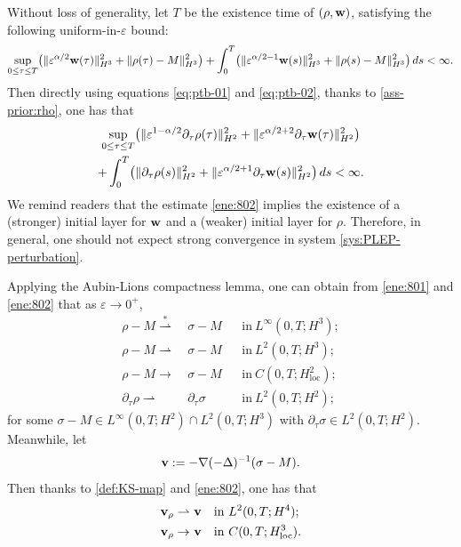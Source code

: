 \documentclass[11pt]{article}
\theoremstyle{plain}
\theoremstyle{definition}
\theoremstyle{remark}
\newcommand{\mrm}[1]{\mathrm{#1}}
\newcommand{\dtau}{\partial_\tau}
\renewcommand{\vec}[1]{{\bf #1}}
\newcommand{\norm}[2]{\Vert #1 \Vert_{#2}}
\numberwithin{equation}{section}
\begin{document}
Without loss of generality, let $ T $ be the existence time of $ (\rho, \vec w) $, satisfying the following uniform-in-$\varepsilon $ bound:
\begin{equation}
    \label{ene:801}
    \begin{aligned}
        \sup_{0\leq \tau \leq T} \bigl( \norm{\varepsilon^{\alpha/2} \vec w(\tau)}{H^3}^2 + \norm{\rho(\tau)-M}{H^3}^2 \bigr) + \int_0^T \bigl( \norm{\varepsilon^{\alpha/2-1}\vec w(s)}{H^3}^2 + \norm{\rho(s)-M}{H^3}^2 \bigr) \,ds < \infty. 
    \end{aligned}
\end{equation}
Then directly using equations \eqref{eq:ptb-01} and \eqref{eq:ptb-02}, thanks to \eqref{ass-prior:rho}, one has that
\begin{equation}
    \label{ene:802}
    \begin{gathered}
    \sup_{0 \leq \tau \leq T} \bigl( \norm{\varepsilon^{1-\alpha/2}\dtau\rho(\tau)}{H^2}^2 + \norm{\varepsilon^{\alpha/2+2}\dtau \vec w(\tau)}{H^2}^2 \bigr) \\
    + \int_0^T \bigl( \norm{\dtau\rho(s)}{H^2}^2 + \norm{\varepsilon^{\alpha/2 + 1}\dtau \vec w(s)}{H^2}^2 \bigr) \,ds < \infty.
    \end{gathered}
\end{equation}
We remind readers that the estimate \eqref{ene:802} implies the existence of a (stronger) initial layer for $ \vec w $ and a (weaker) initial layer for $ \rho $. Therefore, in general, one should not expect strong convergence in system \eqref{sys:PLEP-perturbation}. 

Applying the Aubin-Lions compactness lemma, one can obtain from \eqref{ene:801} and \eqref{ene:802} that as $ \varepsilon \rightarrow 0^+ $,
\begin{align}
    \label{ene:803}
    \rho - M  \stackrel{*}{\rightharpoonup} & ~ \sigma - M && \text{in} ~ L^\infty(0,T;H^3);\\
    \label{ene:804}
    \rho - M {\rightharpoonup} & ~ \sigma - M && \text{in} ~ L^2(0,T;H^3); \\
    \label{ene:805}
    \rho - M \rightarrow & ~ \sigma - M && \text{in} ~ C(0,T;H^2_\mrm{loc}); \\
    \label{ene:806}
    \dtau \rho \rightharpoonup & ~ \dtau \sigma && \text{in} ~ L^2(0,T;H^2);
\end{align}
for some $ \sigma - M \in L^\infty(0,T;H^2)\cap L^2(0,T;H^3) $ with $ \dtau \sigma \in L^2(0,T;H^2) $. 
Meanwhile, let 
\begin{equation}
    \label{ene:807}
    \vec v := - \nabla (-\Delta)^{-1} (\sigma-M). 
\end{equation}
Then thanks to \eqref{def:KS-map} and \eqref{ene:802}, one has that
\begin{align}
    \label{ene:808}
    \vec v_\rho \rightharpoonup & ~ \vec v && \text{in} ~ L^2(0,T;H^4); \\
    \label{ene:809}
    \vec v_\rho \rightarrow & ~ \vec v && \text{in} ~ C(0,T;H^3_\mrm{loc}).
\end{align}
\end{document}
